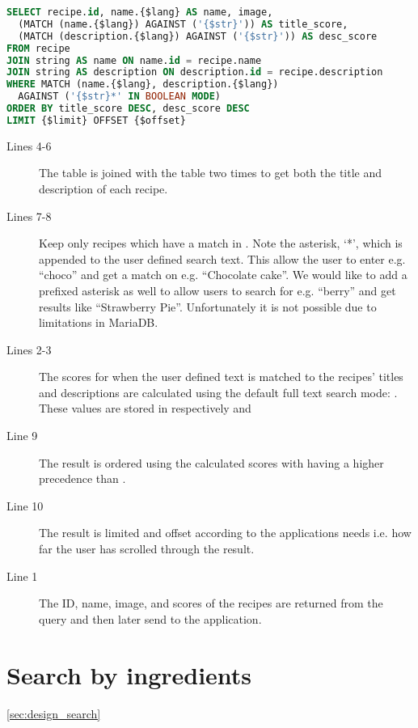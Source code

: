 \begin{lstlisting}[language=SQL, morekeywords={AGAINST,OFFSET,BOOLEAN,MODE}, float=h, label={lst:freetext}, caption={Free-text search.}]
SELECT recipe.id, name.{$lang} AS name, image,
  (MATCH (name.{$lang}) AGAINST ('{$str}')) AS title_score,
  (MATCH (description.{$lang}) AGAINST ('{$str}')) AS desc_score
FROM recipe
JOIN string AS name ON name.id = recipe.name
JOIN string AS description ON description.id = recipe.description
WHERE MATCH (name.{$lang}, description.{$lang})
  AGAINST ('{$str}*' IN BOOLEAN MODE)
ORDER BY title_score DESC, desc_score DESC
LIMIT {$limit} OFFSET {$offset}
\end{lstlisting}
\begin{description}
\item[Lines 4-6] The  table is joined with the  table two times to get both the title and description of each recipe.
\item[Lines 7-8] Keep only recipes which have a match in . Note the asterisk, `*', which is appended to the user defined search text. This allow the user to enter e.g. ``choco'' and get a match on e.g. ``Chocolate cake''. We would like to add a prefixed asterisk as well to allow users to search for e.g. ``berry'' and get results like ``Strawberry Pie''. Unfortunately it is not possible due to limitations in MariaDB.
\item[Lines 2-3] The scores for when the user defined text is matched to the recipes' titles and descriptions are calculated using the default full text search mode: . These values are stored in respectively  and 
\item[Line 9] The result is ordered using the calculated scores with  having a higher precedence than .
\item[Line 10] The result is limited and offset according to the applications needs i.e. how far the user has scrolled through the result.
\item[Line 1] The ID, name, image, and scores of the recipes are returned from the query and then later send to the application.
\end{description}



\section{Search by ingredients}
\ref{sec:design_search}

